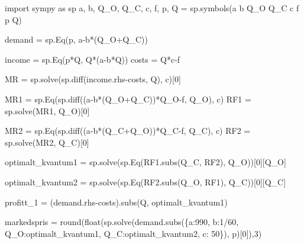 \documentclass[
  12pt,
  a4paper,
  DIV=11,
  numbers=noendperiod]{scrartcl}
\newenvironment{Shaded}{\begin{snugshade}}{\end{snugshade}}
\newcommand{\BuiltInTok}[1]{\textcolor[rgb]{0.00,0.23,0.31}{#1}}
\newcommand{\DecValTok}[1]{\textcolor[rgb]{0.68,0.00,0.00}{#1}}
\newcommand{\ImportTok}[1]{\textcolor[rgb]{0.00,0.46,0.62}{#1}}
\newcommand{\NormalTok}[1]{\textcolor[rgb]{0.00,0.23,0.31}{#1}}
\newcommand{\OperatorTok}[1]{\textcolor[rgb]{0.37,0.37,0.37}{#1}}
\newcommand{\StringTok}[1]{\textcolor[rgb]{0.13,0.47,0.30}{#1}}
\begin{document}
\begin{Shaded}
\begin{Highlighting}[]
\ImportTok{import}\NormalTok{ sympy }\ImportTok{as}\NormalTok{ sp}
\NormalTok{a, b, Q\_O, Q\_C, c, f, p, Q }\OperatorTok{=}\NormalTok{ sp.symbols(}\StringTok{\textquotesingle{}a b Q\_O Q\_C c f p Q\textquotesingle{}}\NormalTok{)}


\NormalTok{demand }\OperatorTok{=}\NormalTok{ sp.Eq(p, a}\OperatorTok{{-}}\NormalTok{b}\OperatorTok{*}\NormalTok{(Q\_O}\OperatorTok{+}\NormalTok{Q\_C))}

\NormalTok{income }\OperatorTok{=}\NormalTok{ sp.Eq(p}\OperatorTok{*}\NormalTok{Q, Q}\OperatorTok{*}\NormalTok{(a}\OperatorTok{{-}}\NormalTok{b}\OperatorTok{*}\NormalTok{Q))}
\NormalTok{costs }\OperatorTok{=}\NormalTok{ Q}\OperatorTok{*}\NormalTok{c}\OperatorTok{{-}}\NormalTok{f}

\NormalTok{MR }\OperatorTok{=}\NormalTok{ sp.solve(sp.diff(income.rhs}\OperatorTok{{-}}\NormalTok{costs, Q), c)[}\DecValTok{0}\NormalTok{]}

\NormalTok{MR1 }\OperatorTok{=}\NormalTok{ sp.Eq(sp.diff((a}\OperatorTok{{-}}\NormalTok{b}\OperatorTok{*}\NormalTok{(Q\_O}\OperatorTok{+}\NormalTok{Q\_C))}\OperatorTok{*}\NormalTok{Q\_O}\OperatorTok{{-}}\NormalTok{f, Q\_O), c)}
\NormalTok{RF1  }\OperatorTok{=}\NormalTok{ sp.solve(MR1, Q\_O)[}\DecValTok{0}\NormalTok{]}

\NormalTok{MR2 }\OperatorTok{=}\NormalTok{ sp.Eq(sp.diff((a}\OperatorTok{{-}}\NormalTok{b}\OperatorTok{*}\NormalTok{(Q\_C}\OperatorTok{+}\NormalTok{Q\_O))}\OperatorTok{*}\NormalTok{Q\_C}\OperatorTok{{-}}\NormalTok{f, Q\_C), c)}
\NormalTok{RF2 }\OperatorTok{=}\NormalTok{ sp.solve(MR2, Q\_C)[}\DecValTok{0}\NormalTok{]}


\NormalTok{optimalt\_kvantum1 }\OperatorTok{=}\NormalTok{ sp.solve(sp.Eq(RF1.subs(Q\_C, RF2), Q\_O))[}\DecValTok{0}\NormalTok{][Q\_O]}

\NormalTok{optimalt\_kvantum2 }\OperatorTok{=}\NormalTok{ sp.solve(sp.Eq(RF2.subs(Q\_O, RF1), Q\_C))[}\DecValTok{0}\NormalTok{][Q\_C]}

\NormalTok{profitt\_1 }\OperatorTok{=}\NormalTok{ (demand.rhs}\OperatorTok{{-}}\NormalTok{costs).subs(Q, optimalt\_kvantum1)}


\NormalTok{markedspris }\OperatorTok{=} \BuiltInTok{round}\NormalTok{(}\BuiltInTok{float}\NormalTok{(sp.solve(demand.subs(\{a:}\DecValTok{990}\NormalTok{, b:}\DecValTok{1}\OperatorTok{/}\DecValTok{60}\NormalTok{, Q\_O:optimalt\_kvantum1, Q\_C:optimalt\_kvantum2, c: }\DecValTok{50}\NormalTok{\}), p)[}\DecValTok{0}\NormalTok{]),}\DecValTok{3}\NormalTok{)}


\end{Highlighting}
\end{Shaded}
\end{document}
